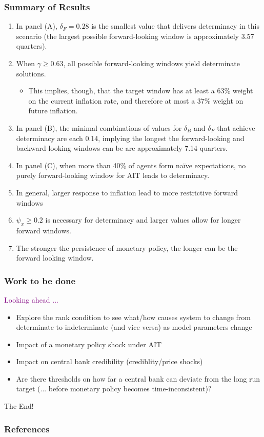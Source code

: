 \documentclass{beamer}
\begin{document}
\begin{frame}[allowframebreaks]
	\frametitle{Summary of Results}
	\begin{enumerate}
		\setlength{\itemsep}{1em}
		\item In panel (A), $\delta_F =0.28$ is the smallest value that delivers determinacy in this scenario (the largest possible forward-looking window is approximately 3.57 quarters).
		\item When $\gamma \geq 0.63$, all possible forward-looking windows yield determinate solutions. 
		\begin{itemize}
			\item This implies, though, that the target window has at least a 63\% weight on the current inflation rate, and therefore at most a 37\% weight on future inflation.
		\end{itemize}
		\item In panel (B), the minimal combinations of values for $\delta_B$ and $\delta_F$ that achieve determinacy are each 0.14, implying the longest the forward-looking and backward-looking windows can be are approximately 7.14 quarters.
		\item In panel (C), when more than 40\% of agents form na\"ive expectations, no purely forward-looking window for AIT leads to determinacy.
		\item In general, larger response to inflation lead to more restrictive forward windows
		\item $\psi_x \geq 0.2$ is necessary for determinacy and larger values allow for longer forward windows.  
		\item The stronger the persistence of monetary policy, the longer can be the forward looking window.
	\end{enumerate}
\end{frame}

\begin{frame}
	\frametitle{Work to be done}
	\textcolor{purple}{Looking ahead ...}
	\begin{itemize}
		\setlength{\itemsep}{1em}
		\item Explore the rank condition to see what/how causes system to change from determinate to indeterminate (and vice versa) as model parameters change
		\item Impact of a monetary policy shock under AIT
		\item Impact on central bank credibility (crediblity/price shocks)
		\item Are there thresholds on how far a central bank can deviate from the long run target (... before monetary policy becomes time-inconsistent)?
	\end{itemize}
\end{frame}

\begin{frame}
	\centering
	The End!
\end{frame}

\appendix
\begin{frame}[allowframebreaks]
	\frametitle{References}
	
	
\end{frame}
\end{document}
